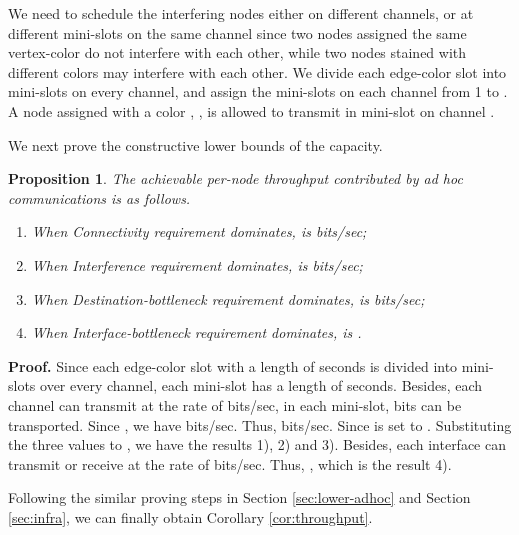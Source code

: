 \documentclass[10pt,journal]{IEEEtran}
\newtheorem{proposition}{Proposition}
\def\done{\hspace*{\fill} }
\begin{document}
We need to schedule the interfering nodes either on different channels, or at different mini-slots on the same channel since two nodes assigned the same vertex-color do not interfere with each other, while two nodes stained with different colors may interfere with each other. We divide each edge-color slot into  mini-slots on every channel, and assign the mini-slots on each channel from 1 to . A node assigned with a color , , is allowed to transmit in mini-slot  on channel .

We next prove the constructive lower bounds of the capacity. 
\begin{proposition}
\label{prop:lower-adhoc-da}
The achievable per-node throughput  contributed by ad hoc communications is as follows.
\begin{enumerate}
\item[1)] When Connectivity requirement dominates,  is  bits/sec;
\item[2)] When Interference requirement dominates,  is  bits/sec;
\item[3)] When Destination-bottleneck requirement dominates,  is  bits/sec;
\item[4)] When Interface-bottleneck requirement dominates,  is .
\end{enumerate}
\end{proposition}
\textbf{Proof.}
Since each edge-color slot with a length of  seconds is divided into  mini-slots over every channel, each mini-slot has a length of  seconds. Besides, each channel can transmit at the rate of  bits/sec, in each mini-slot,  bits can be transported. Since , we have  bits/sec. Thus,  bits/sec. Since  is set to . Substituting the three values to , we have the results 1), 2) and 3). Besides, each interface can transmit or receive at the rate of  bits/sec. Thus, , which is the result 4).

Following the similar proving steps in Section \ref{sec:lower-adhoc} and Section \ref{sec:infra}, we can finally obtain Corollary \ref{cor:throughput}.
\done

\end{document}
